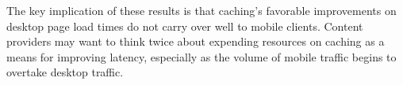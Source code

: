
The key implication of these results is that caching's favorable improvements on desktop page load times do not carry over well to mobile clients. Content providers may want to think twice about expending resources on caching as a means for improving latency, especially as the volume of mobile traffic begins to overtake desktop traffic.

